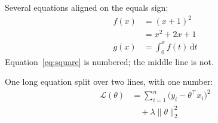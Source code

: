 \documentclass{article}
\begin{document}
Several equations aligned on the equals sign:
\begin{align}
  f(x) &= (x + 1)^2 \label{eq:square} \\
       &= x^2 + 2x + 1 \nonumber \\
  g(x) &= \int_0^x f(t)\,\mathrm{d}t
\end{align}
Equation~\eqref{eq:square} is numbered; the middle line is not.

One long equation split over two lines, with one number:
\begin{equation}
  \begin{split}
    \mathcal{L}(\theta) &= \sum_{i=1}^{n} \bigl(y_i - \theta^\top x_i\bigr)^2 \\
                        &\quad + \lambda \lVert \theta \rVert_2^2
  \end{split}
  \label{eq:loss}
\end{equation}
\end{document}
